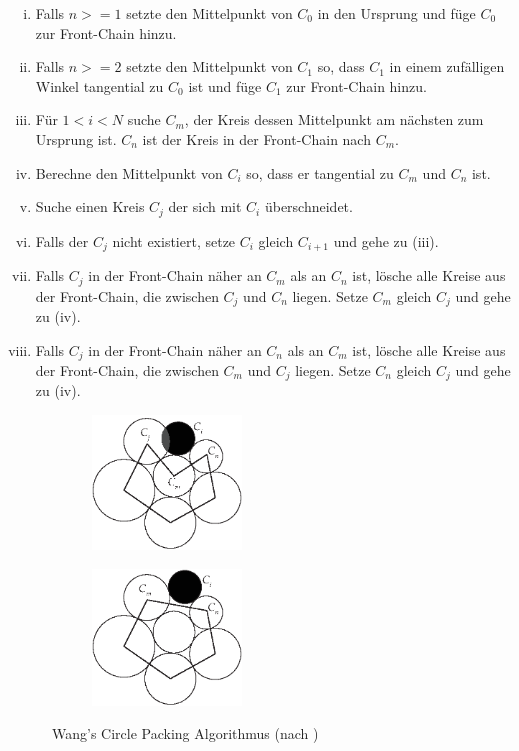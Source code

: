 \begin{enumerate}[(i), labelindent=0pt, align=left, itemsep=0pt, parsep=0pt, labelsep=.5em, leftmargin=!]
  \item Falls $n >= 1$ setzte den Mittelpunkt von $C_0$ in den Ursprung und füge $C_0$ zur Front-Chain hinzu.
  \item Falls $n >= 2$ setzte den Mittelpunkt von $C_1$ so, dass $C_1$ in einem zufälligen Winkel tangential zu $C_0$ ist und füge $C_1$ zur Front-Chain hinzu.
  \item Für $1 < i < N$ suche $C_m$, der Kreis dessen Mittelpunkt am nächsten zum Ursprung ist. $C_n$ ist der Kreis in der Front-Chain nach $C_m$.
  \item Berechne den Mittelpunkt von $C_i$ so, dass er tangential zu $C_m$ und $C_n$ ist.
  \item Suche einen Kreis $C_j$ der sich mit $C_i$ überschneidet.
  \item Falls der $C_j$ nicht existiert, setze $C_i$ gleich $C_{i+1}$ und gehe zu (iii).
  \item Falls $C_j$ in der Front-Chain näher an $C_m$ als an $C_n$ ist, lösche alle Kreise aus der Front-Chain, die zwischen $C_j$ und $C_n$ liegen. Setze $C_m$ gleich $C_j$ und gehe zu (iv).
  \item Falls $C_j$ in der Front-Chain näher an $C_n$ als an $C_m$ ist, lösche alle Kreise aus der Front-Chain, die zwischen $C_m$ und $C_j$ liegen. Setze $C_n$ gleich $C_j$ und gehe zu (iv).
\end{enumerate}

\label{subsec:collision}\setlength{\fwidth}{.4\textwidth}
\begin{figure}[htb]
  \captionsetup{justification=centering}
  \begin{subfigure}[t]{\fwidth}
   \includegraphics[width=150px]{figures/add-circle}
    \label{fig:add-circle}
  \end{subfigure}
  \hspace{1cm}
  \begin{subfigure}[t]{\fwidth}
  	\includegraphics[width=150px]{figures/update-frontchain}
  	 \label{fig:update-frontchain}
  \end{subfigure}
  \caption{Wang's Circle Packing Algorithmus (nach \cite{bostock2017abetter})}
  \label{fig:circle-packing}
\end{figure}

